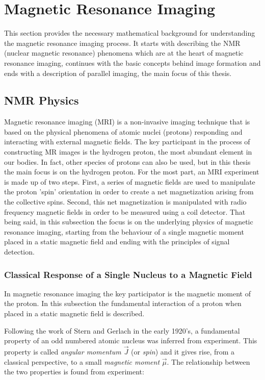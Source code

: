 \chapter{Magnetic Resonance Imaging}
\label{chapterlabel2}

This section provides the necessary mathematical background for understanding the magnetic resonance imaging process. It starts with describing the NMR (nuclear magnetic resonance) phenomena which are at the heart of magnetic resonance imaging, continues with the basic concepts behind image formation and ends with a description of parallel imaging, the main focus of this thesis.

\section{NMR Physics}
Magnetic resonance imaging (MRI) is a non-invasive imaging technique that is based on the physical phenomena of atomic nuclei (protons) responding and interacting with external magnetic fields. The key participant in the process of constructing MR images is the hydrogen proton, the most abundant element in our bodies. In fact, other species of protons can also be used, but in this thesis the main focus is on the hydrogen proton. For the most part, an MRI experiment is made up of two steps. First, a series of magnetic fields are used to manipulate the proton 'spin' orientation in order to create a net magnetization arising from the collective spins. Second, this net magnetization is manipulated with radio frequency magnetic fields in order to be measured using a coil detector. That being said, in this subsection the focus is on the underlying physics of magnetic resonance imaging, starting from the behaviour of a single magnetic moment placed in a static magnetic field and ending with the principles of signal detection.

\subsection{Classical Response of a Single Nucleus to a Magnetic Field}
In magnetic resonance imaging the key participator is the magnetic moment of the proton. In this subsection the fundamental interaction of a proton when placed in a static magnetic field is described.

Following the work of Stern and Gerlach in the early 1920's, 
a fundamental property of an odd numbered atomic nucleus was inferred from experiment. 
This property is called \textit{angular momentum $\vec{J}$} (or \textit{spin}) and it gives rise, from a classical perspective, to a small \textit{magnetic moment} $\vec{\mu}$. 
The relationship between the two properties is found from experiment:


